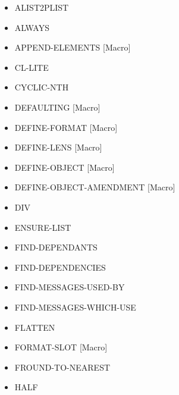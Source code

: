 \documentclass [11pt]{book}
\begin{document}
\label{subsec:functionandmacrodefinitions}



\begin{itemize}

\item {}ALIST2PLIST

\item {}ALWAYS

\item {}APPEND-ELEMENTS [Macro]

\item {}CL-LITE

\item {}CYCLIC-NTH

\item {}DEFAULTING [Macro]

\item {}DEFINE-FORMAT [Macro]

\item {}DEFINE-LENS [Macro]

\item {}DEFINE-OBJECT [Macro]

\item {}DEFINE-OBJECT-AMENDMENT [Macro]

\item {}DIV

\item {}ENSURE-LIST

\item {}FIND-DEPENDANTS

\item {}FIND-DEPENDENCIES

\item {}FIND-MESSAGES-USED-BY

\item {}FIND-MESSAGES-WHICH-USE

\item {}FLATTEN

\item {}FORMAT-SLOT [Macro]

\item {}FROUND-TO-NEAREST

\item {}HALF


\end{itemize}
\end{document}
